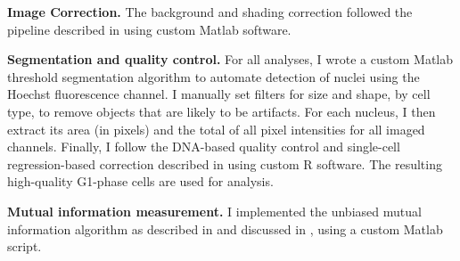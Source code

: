 \textbf{Image Correction.}
The background and shading correction
followed the pipeline described in 
using custom Matlab software.


\textbf{Segmentation and quality control.} For
all analyses, I wrote a custom Matlab threshold segmentation algorithm 
to automate detection of nuclei using the
Hoechst fluorescence channel. 
I manually set filters for size and shape, by cell type, to remove objects that are
likely to be artifacts. For each nucleus, I then extract
its area (in pixels) and the total of all pixel intensities
for all imaged channels. Finally, I follow the DNA-based
quality control and single-cell regression-based correction
described in  using custom R software.
The resulting high-quality G1-phase cells are used for analysis.


\textbf{Mutual information measurement.} I implemented
the unbiased mutual information algorithm as described in
\cite{Cheong2011} and discussed in ,
using a custom Matlab script. 
